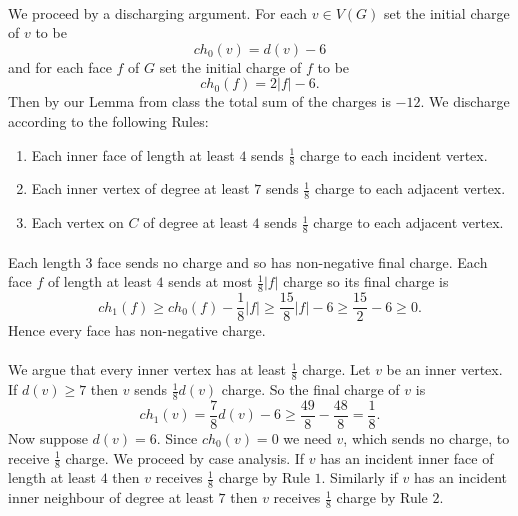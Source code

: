 \documentclass[letterpaper,12pt,oneside,onecolumn]{article}
\begin{document}
\paragraph{} 
We proceed by a discharging argument. For each $v \in V(G)$ set the initial charge of $v$ to be
$$ch_0(v) = d(v) - 6$$
and for each face $f$ of $G$ set the initial charge of $f$ to be
$$ch_0(f) = 2|f| - 6.$$
Then by our Lemma from class the total sum of the charges is $-12$. We discharge according to the following Rules:
\begin{enumerate}
	\item Each inner face of length at least $4$ sends $\frac{1}{8}$ charge to each incident vertex.
	\item Each inner vertex of degree at least $7$ sends $\frac{1}{8}$ charge to each adjacent vertex.
	\item Each vertex on $C$ of degree at least $4$ sends $\frac{1}{8}$ charge to each adjacent vertex.
\end{enumerate}
\paragraph{}
Each length $3$ face sends no charge and so has non-negative final charge. Each face $f$ of length at least $4$ sends at most $\frac{1}{8}|f|$ charge so its final charge is
$$ch_1(f) \geq ch_0(f) -\frac{1}{8}|f| \geq \frac{15}{8}|f| - 6 \geq\frac{15}{2} - 6 \geq 0.$$
Hence every face has non-negative charge.
\paragraph{}
We argue that every inner vertex has at least $\frac{1}{8}$ charge. Let $v$ be an inner vertex. If $d(v) \geq 7$ then $v$ sends $\frac{1}{8}d(v)$ charge. So the final charge of $v$ is 
$$ch_1(v) = \frac{7}{8}d(v) - 6 \geq \frac{49}{8} - \frac{48}{8}  = \frac{1}{8}.$$
Now suppose $d(v) = 6.$ Since $ch_0(v) = 0$ we need $v$, which sends no charge, to receive $\frac{1}{8}$ charge. We proceed by case analysis. If $v$ has an incident inner face of length at least $4$ then $v$ receives $\frac{1}{8}$ charge by Rule $1.$ Similarly if $v$ has an incident inner neighbour of degree at least $7$ then $v$ receives $\frac{1}{8}$ charge by Rule $2.$
\end{document}
